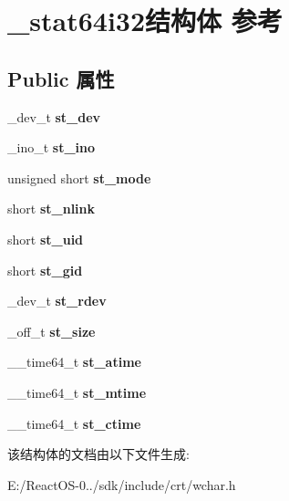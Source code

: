 \hypertarget{struct__stat64i32}{}\section{\+\_\+stat64i32结构体 参考}
\label{struct__stat64i32}
\subsection*{Public 属性}
\begin{DoxyCompactItemize}
\item 
\mbox{\label{struct__stat64i32_a2b4a2e308d650b609fdd03a9b3a419f5}} 
\+\_\+dev\+\_\+t {\bfseries st\+\_\+dev}
\item 
\mbox{\label{struct__stat64i32_aee87ca521fe73b60344818f0b72c86e7}} 
\+\_\+ino\+\_\+t {\bfseries st\+\_\+ino}
\item 
\mbox{\label{struct__stat64i32_ad25f82f47fbfdaede06873f67bf9f300}} 
unsigned short {\bfseries st\+\_\+mode}
\item 
\mbox{\label{struct__stat64i32_a7e1f76f4bb0b5736bcd25c1a80e7ee58}} 
short {\bfseries st\+\_\+nlink}
\item 
\mbox{\label{struct__stat64i32_aa983fdd3cbec3023bedb83992b21cda3}} 
short {\bfseries st\+\_\+uid}
\item 
\mbox{\label{struct__stat64i32_a93e2d215a0a9e38a8582571b7735d5ff}} 
short {\bfseries st\+\_\+gid}
\item 
\mbox{\label{struct__stat64i32_aca194068f23f586accb2d21b3c78e37b}} 
\+\_\+dev\+\_\+t {\bfseries st\+\_\+rdev}
\item 
\mbox{\label{struct__stat64i32_a5b8e68917e4e4f72b659bbbb87d142f7}} 
\+\_\+off\+\_\+t {\bfseries st\+\_\+size}
\item 
\mbox{\label{struct__stat64i32_adcd83a6b256a5f47892929576a267ee5}} 
\+\_\+\+\_\+time64\+\_\+t {\bfseries st\+\_\+atime}
\item 
\mbox{\label{struct__stat64i32_a00fcdded975b10adbeef49c60c969b78}} 
\+\_\+\+\_\+time64\+\_\+t {\bfseries st\+\_\+mtime}
\item 
\mbox{\label{struct__stat64i32_a8d32bda37a7da51f3df53d213fdf347b}} 
\+\_\+\+\_\+time64\+\_\+t {\bfseries st\+\_\+ctime}
\end{DoxyCompactItemize}


该结构体的文档由以下文件生成\+:\begin{DoxyCompactItemize}
\item 
E\+:/\+React\+O\+S-\/0../sdk/include/crt/wchar.\+h\end{DoxyCompactItemize}
